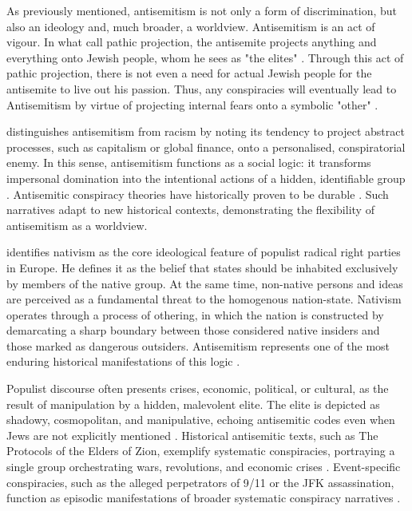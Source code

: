 As previously mentioned, antisemitism is not only a form of discrimination, but also an ideology and, much broader, a worldview. Antisemitism is an act of vigour. In what \citet{adorno_elements_2002} call pathic projection, the antisemite projects anything and everything onto Jewish people, whom he sees as "the elites" \citep{adorno_elements_2002}. Through this act of pathic projection, there is not even a need for actual Jewish people for the antisemite to live out his passion. Thus, any conspiracies will eventually lead to Antisemitism by virtue of projecting internal fears onto a symbolic "other" \citep{rensmann_politics_2017}.

\citet{postone_anti-semitism_1980} distinguishes antisemitism from racism by noting its tendency to project abstract processes, such as capitalism or global finance, onto a personalised, conspiratorial enemy. In this sense, antisemitism functions as a social logic: it transforms impersonal domination into the intentional actions of a hidden, identifiable group \citep{postone_anti-semitism_1980}. Antisemitic conspiracy theories have historically proven to be durable \citep{demata_anti-sorosism_2022}. Such narratives adapt to new historical contexts, demonstrating the flexibility of antisemitism as a worldview.

\citet{mudde_populist_2007} identifies nativism as the core ideological feature of populist radical right parties in Europe. He defines it as the belief that states should be inhabited exclusively by members of the native group. At the same time, non-native persons and ideas are perceived as a fundamental threat to the homogenous nation-state. Nativism operates through a process of othering, in which the nation is constructed by demarcating a sharp boundary between those considered native insiders and those marked as dangerous outsiders. Antisemitism represents one of the most enduring historical manifestations of this logic \citep{mudde_populist_2007}.

Populist discourse often presents crises, economic, political, or cultural, as the result of manipulation by a hidden, malevolent elite. The elite is depicted as shadowy, cosmopolitan, and manipulative, echoing antisemitic codes even when Jews are not explicitly mentioned \citep{wodak_politics_2021}. Historical antisemitic texts, such as The Protocols of the Elders of Zion, exemplify systematic conspiracies, portraying a single group orchestrating wars, revolutions, and economic crises \citep{simonsen_antisemitism_2020}. Event-specific conspiracies, such as the alleged perpetrators of 9/11 or the JFK assassination, function as episodic manifestations of broader systematic conspiracy narratives .

